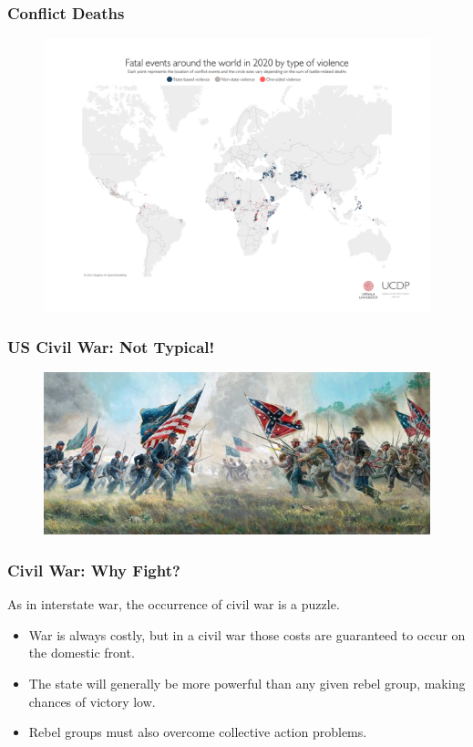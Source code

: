 \documentclass[handout]{beamer}
\begin{document}
\begin{frame} 
	\frametitle{\LARGE{Conflict Deaths}}
	\begin{figure}[ht!]
		\centering
		\includegraphics[width=\textwidth,height=\textheight,keepaspectratio]{worldin2020.png}
	\end{figure}
\end{frame}

\begin{frame} 
	\frametitle{\LARGE{US Civil War: Not Typical!}}
	\begin{figure}[ht!]
		\centering
		\includegraphics[width=\textwidth,height=\textheight,keepaspectratio]{uscivwar.jpeg}
	\end{figure}
\end{frame}

\begin{frame} 
\frametitle{\LARGE{Civil War: Why Fight?}}
As in interstate war, the occurrence of civil war is a puzzle. \pause
\begin{itemize}
		\item War is always costly, but in a civil war those costs are guaranteed to occur on the domestic front. \pause
		\item The state will generally be more powerful than any given rebel group, making chances of victory low. \pause
		\item Rebel groups must also overcome collective action problems.
\end{itemize}
\end{frame}
\end{document}
